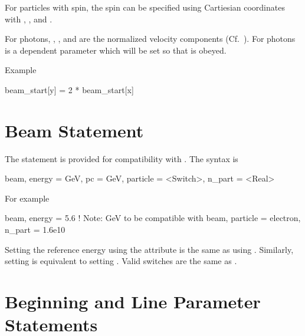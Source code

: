 For particles with spin, the spin can be specified using Cartiesian coordinates with ,
, and .

For photons, , , and  are the normalized velocity components
(Cf.~). For photons  is a dependent parameter which will be set
so that  is obeyed.


Example
\begin{example}
  beam_start[y] = 2 * beam_start[x]
\end{example}

\section{Beam Statement}
\label{s:beam.mad}

The  statement is provided for compatibility with \mad. The syntax is
\begin{example}
  beam, energy = GeV, pc = GeV, particle = <Switch>, n_part = <Real>
\end{example}
For example
\begin{example}
  beam, energy = 5.6  ! Note: GeV to be compatible with \mad
  beam, particle = electron, n_part = 1.6e10
\end{example}
Setting the reference energy using the  attribute is the
same as using . Similarly, setting  is
equivalent to setting . Valid  switches
are the same as .

\section{Beginning and Line Parameter Statements}
\label{s:beginning}

